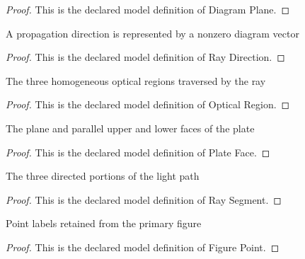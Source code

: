 \begin{proof}
  This is the declared model definition of Diagram Plane.
\end{proof}
\begin{definition}
  \label{def:physics:phyx-mini-0102:phyxminiproblems-problemphyxmini0102-raydirection}
  A propagation direction is represented by a nonzero diagram vector
\end{definition}
\begin{proof}
  This is the declared model definition of Ray Direction.
\end{proof}
\begin{definition}
  \label{def:physics:phyx-mini-0102:phyxminiproblems-problemphyxmini0102-opticalregion}
  The three homogeneous optical regions traversed by the ray
\end{definition}
\begin{proof}
  This is the declared model definition of Optical Region.
\end{proof}
\begin{definition}
  \label{def:physics:phyx-mini-0102:phyxminiproblems-problemphyxmini0102-plateface}
  The plane and parallel upper and lower faces of the plate
\end{definition}
\begin{proof}
  This is the declared model definition of Plate Face.
\end{proof}
\begin{definition}
  \label{def:physics:phyx-mini-0102:phyxminiproblems-problemphyxmini0102-raysegment}
  The three directed portions of the light path
\end{definition}
\begin{proof}
  This is the declared model definition of Ray Segment.
\end{proof}
\begin{definition}
  \label{def:physics:phyx-mini-0102:phyxminiproblems-problemphyxmini0102-figurepoint}
  Point labels retained from the primary figure
\end{definition}
\begin{proof}
  This is the declared model definition of Figure Point.
\end{proof}
